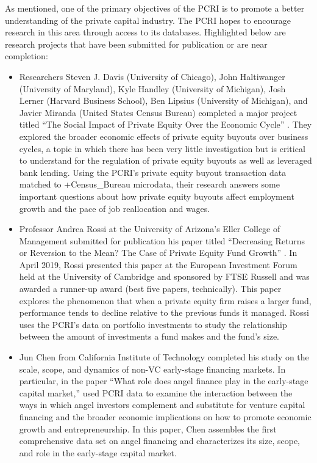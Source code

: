 \documentclass[
]{WileySix}
\begin{document}
As mentioned, one of the primary objectives of the PCRI is to promote a better understanding of the private capital industry. The PCRI hopes to encourage research in this area through access to its databases. Highlighted below are research projects that have been submitted for publication or are near completion:

\begin{itemize}
\item
  Researchers Steven J. Davis (University of Chicago), John Haltiwanger (University of Maryland), Kyle Handley (University of Michigan), Josh Lerner (Harvard Business School), Ben Lipsius (University of Michigan), and Javier Miranda (United States Census Bureau) completed a major project titled ``The Social Impact of Private Equity Over the Economic Cycle'' \citep{davis2019}. They explored the broader economic effects of private equity buyouts over business cycles, a topic in which there has been very little investigation but is critical to understand for the regulation of private equity buyouts as well as leveraged bank lending. Using the PCRI's private equity buyout transaction data matched to +Census\_Bureau\textbar{} microdata, their research answers some important questions about how private equity buyouts affect employment growth and the pace of job reallocation and wages.
\item
  Professor Andrea Rossi at the University of Arizona's Eller College of Management submitted for publication his paper titled ``Decreasing Returns or Reversion to the Mean? The Case of Private Equity Fund Growth'' \citeyearpar{rossi2019}. In April 2019, Rossi presented this paper at the European Investment Forum held at the University of Cambridge and sponsored by FTSE Russell and was awarded a runner-up award (best five papers, technically). This paper explores the phenomenon that when a private equity firm raises a larger fund, performance tends to decline relative to the previous funds it managed. Rossi uses the PCRI's data on portfolio investments to study the relationship between the amount of investments a fund makes and the fund's size.
\item
  Jun Chen from California Institute of Technology completed his study on the scale, scope, and dynamics of non-VC early-stage financing markets. In particular, in the paper ``What role does angel finance play in the early-stage capital market,'' \citeyearpar{chen2017} used PCRI data to examine the interaction between the ways in which angel investors complement and substitute for venture capital financing and the broader economic implications on how to promote economic growth and entrepreneurship. In this paper, Chen assembles the first comprehensive data set on angel financing and characterizes its size, scope, and role in the early-stage capital market.

\end{itemize}
\end{document}
